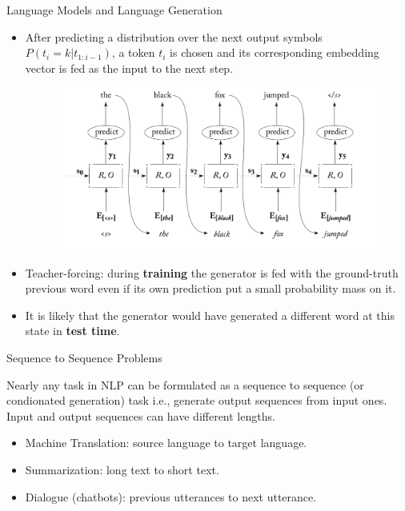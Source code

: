\begin{frame}{Language Models and Language Generation}
\begin{scriptsize}
\begin{itemize}
\item After predicting a distribution over the next output symbols $P(t_i = k | t_{1:i-1})$, a token $t_i$ is chosen and its corresponding embedding vector is fed as the input to the next step.
         \begin{figure}[h]
        	\includegraphics[scale = 0.25]{pics/generator.png}
        \end{figure}  
        
\item Teacher-forcing: during \textbf{training} the generator is fed with the ground-truth previous word even if its own prediction put a small probability mass on it. 
\item It is likely that the generator would have generated a different word at this state in \textbf{test time}.        
\end{itemize}
        
        
\end{scriptsize}
\end{frame}




\begin{frame}{Sequence to Sequence Problems}
\begin{scriptsize}
Nearly any task in NLP can be formulated as a sequence to sequence (or condionated generation) task i.e., generate output sequences from input ones. Input and output sequences can have different lengths.
\begin{itemize}
\item Machine Translation: source language to target language.
\item Summarization: long text to short text.
\item Dialogue (chatbots): previous utterances to next utterance.
\end{itemize}
\end{scriptsize}
\end{frame}



